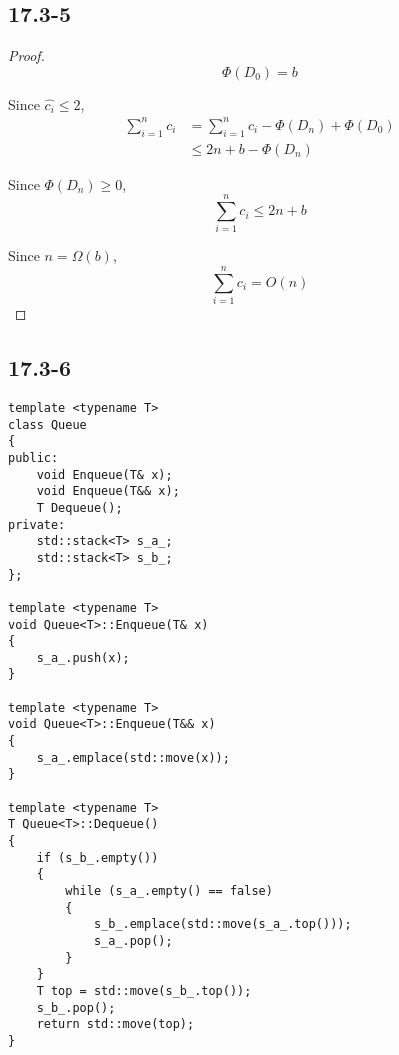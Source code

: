 \subsection*{17.3-5}

\begin{proof}
    \begin{equation*}
        \Phi(D_0) = b
    \end{equation*}
    
    Since $\hat{c_i} \leq 2$,
    \begin{equation*}
    \begin{split}
        \sum\limits_{i = 1}^n c_i
        & = \sum\limits_{i = 1}^n \hat{c_i}
        - \Phi(D_{n}) + \Phi(D_{0}) \\
        & \leq 2n + b - \Phi(D_{n})
    \end{split}
    \end{equation*}
    
    Since $\Phi(D_{n}) \geq 0$,
    \begin{equation*}
        \sum\limits_{i = 1}^n c_i \leq 2n + b
    \end{equation*}
    
    Since $n = \Omega(b)$,
    \begin{equation*}
        \sum\limits_{i = 1}^n c_i = O(n)
    \end{equation*}
\end{proof}

\subsection*{17.3-6}

\begin{verbatim}
template <typename T>
class Queue
{
public:
    void Enqueue(T& x);
    void Enqueue(T&& x);
    T Dequeue();
private:
    std::stack<T> s_a_;
    std::stack<T> s_b_;
};

template <typename T>
void Queue<T>::Enqueue(T& x)
{
    s_a_.push(x);
}

template <typename T>
void Queue<T>::Enqueue(T&& x)
{
    s_a_.emplace(std::move(x));
}

template <typename T>
T Queue<T>::Dequeue()
{
    if (s_b_.empty())
    {
        while (s_a_.empty() == false)
        {
            s_b_.emplace(std::move(s_a_.top()));
            s_a_.pop();
        }
    }
    T top = std::move(s_b_.top());
    s_b_.pop();
    return std::move(top);
}
\end{verbatim}

